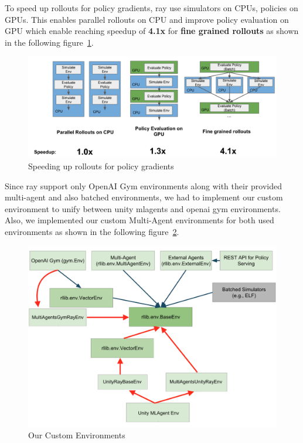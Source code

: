 To speed up rollouts for policy gradients, ray use simulators on CPUs, policies on GPUs. This enables parallel rollouts on CPU and improve policy evaluation on GPU which enable reaching speedup of \textbf{4.1x} for \textbf{fine grained rollouts} as shown in the following figure~\ref{fig:ray_speedup}.
\begin{figure}[!htb]
	\centering
	\includegraphics[width=\textwidth]{figures/architecture/ray_speedup.png}
	\caption[Speeding up rollouts for policy gradients]{Speeding up rollouts for policy gradients\footnotemark}
	\label{fig:ray_speedup}
\end{figure}

Since ray support only OpenAI Gym environments along with their provided multi-agent and also batched environments, we had to implement our custom environment to unify between unity mlagents and openai gym environments. Also, we implemented our custom Multi-Agent environments for both used environments as shown in the following figure~\ref{fig:ray_envs}.

\begin{figure}[!htb]
	\centering
	\includegraphics[width=0.7\linewidth]{figures/architecture/ray_envs.png}
	\caption{Our Custom Environments}
	\label{fig:ray_envs}
\end{figure}


